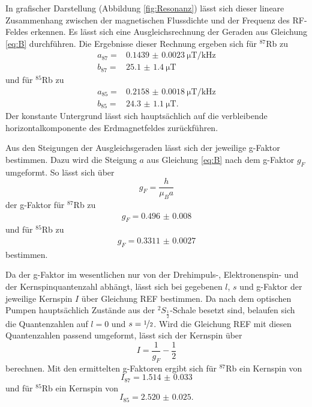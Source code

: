 In grafischer Darstellung (Abbildung \ref{fig:Resonanz}) lässt sich dieser lineare Zusammenhang zwischen der magnetischen Flussdichte und der Frequenz des RF-Feldes erkennen.
Es lässt sich eine Ausgleichsrechnung der Geraden aus Gleichung \eqref{eq:B} durchführen.
Die Ergebnisse dieser Rechnung ergeben sich für $^{87}$Rb zu  
\begin{align*}
    a_{87} = & \SI{0.1439(23)}{\micro\tesla\per\kilo\hertz} \\
    b_{87} = &\SI{25.1(14)}{\micro\tesla} 
\end{align*}
und für $^{85}$Rb zu
\begin{align*}
    a_{85} =& \SI{0.2158(18)}{\micro\tesla\per\kilo\hertz} \\
    b_{85} =&  \SI{24.3(11)}{\micro\tesla}.
\end{align*}
Der konstante Untergrund lässt sich hauptsächlich auf die verbleibende horizontalkomponente des Erdmagnetfeldes zurückführen. 



Aus den Steigungen der Ausgleichsgeraden lässt sich der jeweilige g-Faktor bestimmen.
Dazu wird die Steigung $a$ aus Gleichung \eqref{eq:B} nach dem g-Faktor $g_F$ umgeformt.
So lässt sich über
\begin{equation}
    g_F = \frac{h}{\mu_B a}
\end{equation}
der g-Faktor für $^{87}$Rb zu 
\begin{align*}
    g_F = \num{0.496(8)}
\end{align*}
und für $^{85}$Rb zu 
\begin{align*}
    g_F=\num{0.3311(27)}
\end{align*}
bestimmen.

Da der g-Faktor im wesentlichen nur von der Drehimpuls-, Elektronenspin- und der Kernspinquantenzahl abhängt, lässt sich bei gegebenen $l$, $s$ und g-Faktor der jeweilige Kernspin $I$ über Gleichung REF bestimmen.
Da nach dem optischen Pumpen hauptsächlich Zustände aus der $^2S_{\frac{1}{2}}$-Schale besetzt sind, belaufen sich die Quantenzahlen auf $l=0$ und $s=\nicefrac{1}{2}$.
Wird die Gleichung REF mit diesen Quantenzahlen passend umgeformt, lässt sich der Kernspin über
\begin{equation}
    I = \frac{1}{g_F}-\frac{1}{2}
\end{equation}
berechnen.
Mit den ermittelten g-Faktoren ergibt sich für $^{87}$Rb ein Kernspin von
\begin{equation*}
    I_{87} = \num{1.514(33)}
\end{equation*}
und für $^{85}$Rb ein Kernspin von
\begin{equation*}
    I_{85} = \num{2.520(25)}. 
\end{equation*}



